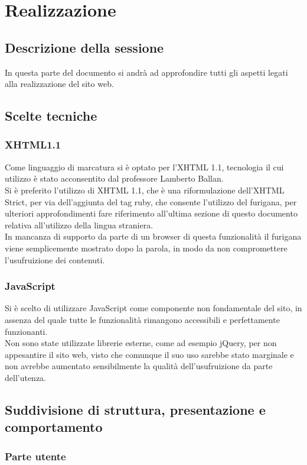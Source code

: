 \documentclass[openany, a4paper, 12pt]{report}
\begin{document}
	\chapter{Realizzazione}
	\section{Descrizione della sessione}
	In questa parte del documento si andrà ad approfondire tutti gli aspetti legati alla realizzazione del sito web.
	
	\section{Scelte tecniche}
	\subsection{XHTML1.1}
	Come linguaggio di marcatura si è optato per l'XHTML 1.1, tecnologia il cui utilizzo è stato acconsentito dal professore Lamberto Ballan.\\
	Si è preferito l'utilizzo di XHTML 1.1, che è una riformulazione dell'XHTML Strict, per via dell'aggiunta del tag ruby, che consente l'utilizzo del furigana, per ulteriori approfondimenti fare riferimento all'ultima sezione di questo documento relativa all'utilizzo della lingua straniera.\\
	In mancanza di supporto da parte di un browser di questa funzionalità il furigana viene semplicemente mostrato dopo la parola, in modo da non compromettere l'usufruizione dei contenuti.
	
	\subsection{JavaScript}
	Si è scelto di utilizzare JavaScript come componente non fondamentale del sito, in assenza del quale tutte le funzionalità rimangono accessibili e perfettamente funzionanti.\\
	Non sono state utilizzate librerie esterne, come ad esempio jQuery, per non appesantire il sito web, visto che comunque il suo uso sarebbe stato marginale e non avrebbe aumentato sensibilmente la qualità dell'usufruizione da parte dell'utenza.
	
	\section{Suddivisione di struttura, presentazione e comportamento}
		\subsection{Parte utente}
\end{document}
